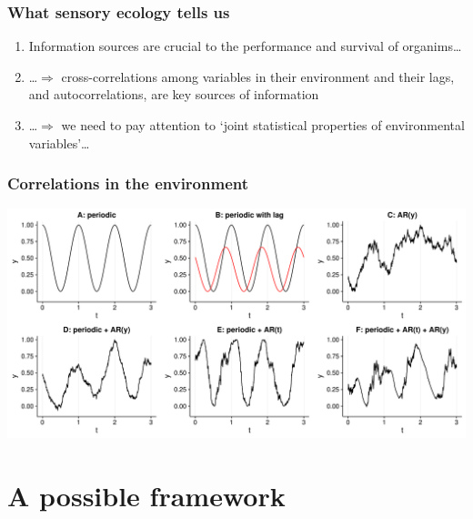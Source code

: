 \documentclass[10pt]{beamer}\usepackage[]{graphicx}\usepackage[]{color}
\begin{document}
\begin{frame}[<+->]
\frametitle{What sensory ecology tells us}
\begin{enumerate}
  \item Information sources are crucial to the performance and survival of organims\ldots
  \item \ldots $\Rightarrow$ cross-correlations among variables in their environment and their lags, and autocorrelations, are key sources of information
  \item \ldots $\Rightarrow$ we need to pay attention to `joint statistical properties of environmental variables'\ldots
\end{enumerate}
\end{frame}

\begin{frame}
  \frametitle{Correlations in the environment}
  \includegraphics[width=\linewidth]{figures/cor_examples2.pdf}
\end{frame}

\section{A possible framework}
\end{document}
